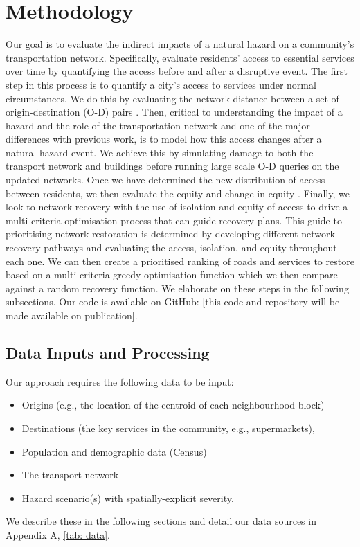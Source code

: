 \documentclass[review,3p,times,onecolumn,sort&compress,12pt]{elsarticle}
\let \cite \parencite
\begin{document}
\section{Methodology}
Our goal is to evaluate the indirect impacts of a natural hazard on a community's transportation network.
Specifically, evaluate residents' access to essential services over time by quantifying the access before and after a disruptive event.
The first step in this process is to quantify a city’s access to services under normal circumstances.
We do this by evaluating the network distance between a set of origin-destination (O-D) pairs \cite{logan2019evaluating,Logan2021-ineq}. 
Then, critical to understanding the impact of a hazard and the role of the transportation network and one of the major differences with previous work, is to model how this access changes after a natural hazard event.
We achieve this by simulating damage to both the transport network and buildings before running large scale O-D queries on the updated networks. 
Once we have determined the new distribution of access between residents, we then evaluate the equity and change in equity \cite{sheriff2020health, Logan2021-ineq}.
Finally, we look to network recovery with the use of isolation and equity of access to drive a multi-criteria optimisation process that can guide recovery plans. 
This guide to prioritising network restoration is determined by developing different network recovery pathways and evaluating the access, isolation, and equity throughout each one.
We can then create a prioritised ranking of roads and services to restore based on a multi-criteria greedy optimisation function which we then compare against a random recovery function. 
We elaborate on these steps in the following subsections.
Our code is available on GitHub: [this code and repository will be made available on publication].

\subsection{Data Inputs and Processing}
Our approach requires the following data to be input: 
\begin{itemize}
\item Origins (e.g., the location of the centroid of each neighbourhood block)
\item Destinations (the key services in the community, e.g., supermarkets), 
\item Population and demographic data (Census)
\item The transport network
\item Hazard scenario(s) with spatially-explicit severity.
\end{itemize}
We describe these in the following sections and detail our data sources in Appendix A, \autoref{tab: data}.
\end{document}
